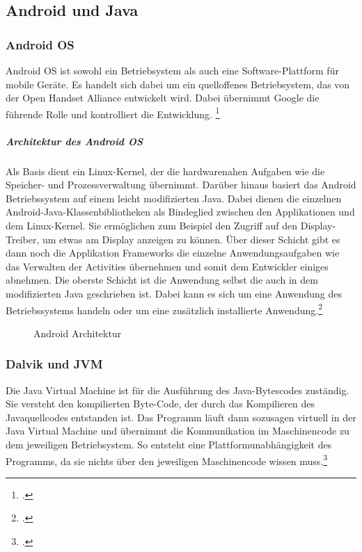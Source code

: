
\subsection{Android und Java}

\subsubsection{Android OS}
Android OS ist sowohl ein Betriebsystem als auch eine Software-Plattform für mobile Geräte. Es handelt sich dabei um ein quelloffenes Betriebsystem, das von der Open Handset Alliance entwickelt wird. Dabei übernimmt Google die führende Rolle und kontrolliert die Entwicklung. \footcite[vgl.][]{android}

\subparagraph{Architektur des Android OS}

Als Basis dient ein Linux-Kernel, der die hardwarenahen Aufgaben wie die Speicher- und Prozessverwaltung übernimmt. Darüber hinaus basiert das Android Betriebssystem auf einem leicht modifizierten Java. Dabei dienen die einzelnen Android-Java-Klassenbibliotheken als Bindeglied zwischen den Applikationen und dem Linux-Kernel. Sie ermöglichen zum Beispiel den Zugriff auf den Display-Treiber, um etwas am Display anzeigen zu können. Über dieser Schicht gibt es dann noch die Applikation Frameworks die einzelne Anwendungsaufgaben wie das Verwalten der Activities übernehmen und somit dem Entwickler einiges abnehmen. Die oberste Schicht ist die Anwendung selbst die auch in dem modifizierten Java geschrieben ist. Dabei kann es sich um eine Anwendung des Betriebssystems handeln  oder  um eine zusätzlich installierte Anwendung.\footcite[vgl.][]{android}

\begin{figure}[htbp]
\centering
\caption{Android Architektur}
\end{figure}
\newpage

\subsubsection{Dalvik und JVM}
Die Java Virtual Machine ist für die Ausführung des Java-Bytescodes zuständig.  Sie versteht den kompilierten Byte-Code, der durch das Kompilieren des Javaquellcodes entstanden ist. Das Programm läuft dann sozusagen virtuell in der Java Virtual Machine und übernimmt die Kommunikation im Maschinencode zu dem jeweiligen Betriebsystem. So entsteht eine Plattformunabhängigkeit des Programms, da sie nichts über den jeweiligen Maschinencode wissen muss.\footcite[vgl.][]{dalvik}


